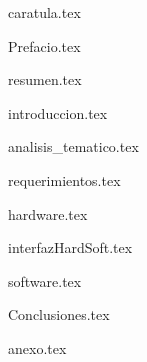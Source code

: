 \documentclass[a4paper,openany,12pt]{book}
\begin{document}
{caratula.tex}

\afterpage{\null\newpage}
\newpage



\mainmatter

\tableofcontents
\listoftables
\listoffigures

{Prefacio.tex}


{resumen.tex}
\afterpage{\null\newpage}
\newpage

{introduccion.tex}

{analisis_tematico.tex}

{requerimientos.tex}

{hardware.tex}

{interfazHardSoft.tex}

{software.tex}

{Conclusiones.tex}

{anexo.tex}





\nocite{*}


\end{document}
